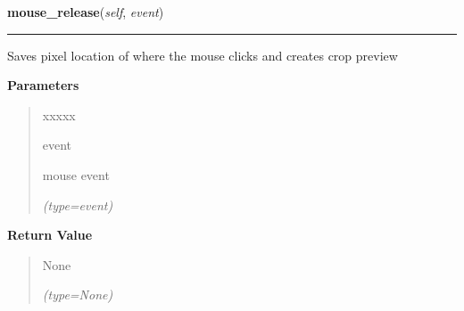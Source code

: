 \hspace{.8\funcindent}\begin{boxedminipage}{\funcwidth}

    \raggedright \textbf{mouse\_release}(\textit{self}, \textit{event})

    \vspace{-1.5ex}

    \rule{\textwidth}{0.5\fboxrule}
\setlength{\parskip}{2ex}
    Saves pixel location of where the mouse clicks and creates crop preview

\setlength{\parskip}{1ex}
      \textbf{Parameters}
      \vspace{-1ex}

      \begin{quote}
        \begin{Ventry}{xxxxx}

          \item[event]

          mouse event

            {\it (type=event)}

        \end{Ventry}

      \end{quote}

      \textbf{Return Value}
    \vspace{-1ex}

      \begin{quote}
      None

      {\it (type=None)}

      \end{quote}

    \end{boxedminipage}

    \label{client_gui:GuiClass:close_window}

    \vspace{0.5ex}

